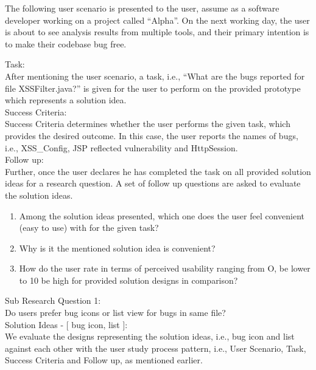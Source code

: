 The following user scenario is presented to the user, assume as a software developer working on a project called “Alpha”. On the next working day, the user is about to see analysis results from multiple tools, and their primary intention is to make their codebase bug free. 

Task: \\

After mentioning the user scenario, a task, i.e., “What are the bugs reported for file XSSFilter.java?” is given for the user to perform on the provided prototype which represents a solution idea. \\

Success Criteria: \\

Success Criteria determines whether the user performs the given task, which provides the desired outcome. In this case, the user reports the names of bugs, i.e., XSS\_Config, JSP reflected vulnerability and HttpSession. \\

Follow up: \\

Further, once the user declares he has completed the task on all provided solution ideas for a research question. A set of follow up questions are asked to evaluate the solution ideas. \\

\begin{enumerate}
\item Among the solution ideas presented, which one does the user feel convenient (easy to use) with for the given task?
\item Why is it the mentioned solution idea is convenient?
\item How do the user rate in terms of perceived usability ranging from O, be lower to 10 be high for provided solution designs in comparison?
\end{enumerate}

Sub Research Question 1: \\

Do users prefer bug icons or list view for bugs in same file? \\

Solution Ideas - [ bug icon, list ]: \\

We evaluate the designs representing the solution ideas, i.e., bug icon and list against each other with the user study process pattern, i.e., User Scenario, Task, Success Criteria and Follow up, as mentioned earlier. \\


